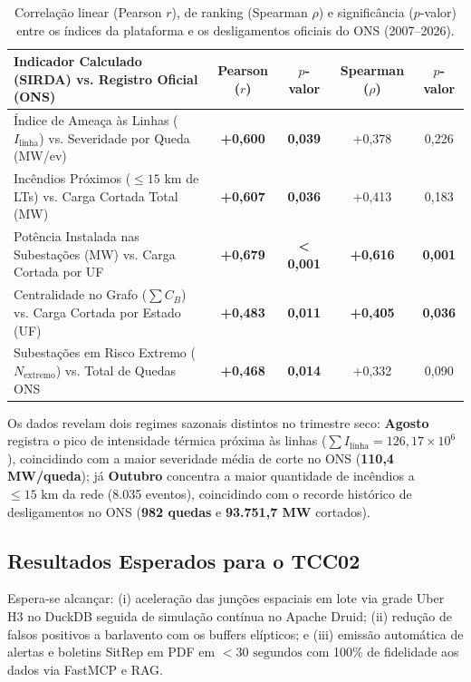 \begin{table}[htbp]
\centering
\small
\renewcommand{\arraystretch}{1.28}
\setlength{\tabcolsep}{5.2pt}
\caption{Correlação linear (Pearson $r$), de ranking (Spearman $\rho$) e significância ($p$-valor) entre os índices da plataforma \cite{sampaio2026ic} e os desligamentos oficiais do ONS (2007--2026).}
\label{tab:validacao_triangulada_tcc}
\begin{tabular}{lcccc}
\toprule
\textbf{Indicador Calculado (SIRDA) vs. Registro Oficial (ONS)} & \textbf{Pearson ($r$)} & \textbf{$p$-valor} & \textbf{Spearman ($\rho$)} & \textbf{$p$-valor} \\
\midrule
Índice de Ameaça às Linhas ($I_{\text{linha}}$) vs. Severidade por Queda (MW/ev) & \textbf{+0,600} & \textbf{0,039} & +0,378 & 0,226 \\
Incêndios Próximos ($\le 15$ km de LTs) vs. Carga Cortada Total (MW)             & \textbf{+0,607} & \textbf{0,036} & +0,413 & 0,183 \\
Potência Instalada nas Subestações (MW) vs. Carga Cortada por UF                 & \textbf{+0,679} & \textbf{< 0,001} & \textbf{+0,616} & \textbf{0,001} \\
Centralidade no Grafo ($\sum C_B$) vs. Carga Cortada por Estado (UF)             & \textbf{+0,483} & \textbf{0,011} & \textbf{+0,405} & \textbf{0,036} \\
Subestações em Risco Extremo ($N_{\text{extremo}}$) vs. Total de Quedas ONS      & \textbf{+0,468} & \textbf{0,014} & +0,332 & 0,090 \\
\bottomrule
\end{tabular}
\end{table}

Os dados revelam dois regimes sazonais distintos no trimestre seco: \textbf{Agosto} registra o pico de intensidade térmica próxima às linhas ($\sum I_{\text{linha}} = 126{,}17 \times 10^6$), coincidindo com a maior severidade média de corte no ONS (\textbf{110,4 MW/queda}); já \textbf{Outubro} concentra a maior quantidade de incêndios a $\le 15\text{ km}$ da rede (8.035 eventos), coincidindo com o recorde histórico de desligamentos no ONS (\textbf{982 quedas} e \textbf{93.751,7 MW} cortados).

\subsection{Resultados Esperados para o TCC02}
Espera-se alcançar: (i) aceleração das junções espaciais em lote via grade Uber H3 no DuckDB seguida de simulação contínua no Apache Druid; (ii) redução de falsos positivos a barlavento com os buffers elípticos; e (iii) emissão automática de alertas e boletins SitRep em PDF em $< 30\text{ segundos}$ com 100\% de fidelidade aos dados via FastMCP e RAG.

